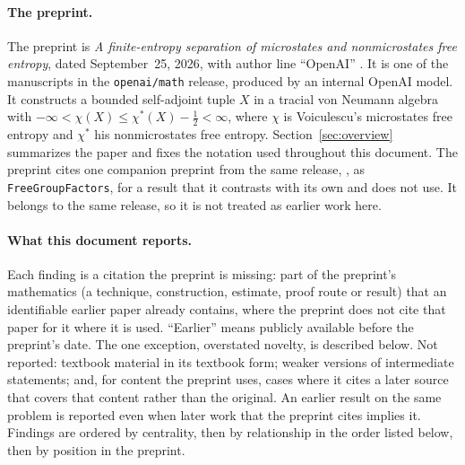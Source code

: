 \documentclass[11pt]{article}
\newcounter{finding}
\begin{document}
\paragraph{The preprint.}
The preprint is \emph{A finite-entropy separation of microstates and
nonmicrostates free entropy}, dated September~25, 2026, with author line
``OpenAI'' \cite{OAI-FiniteEntropySeparation}. It is one of the manuscripts in
the \texttt{openai/math} release, produced by an internal OpenAI model. It
constructs a bounded self-adjoint tuple $X$ in a tracial von Neumann algebra
with $-\infty<\chi(X)\le\chi^*(X)-\tfrac12<\infty$, where $\chi$ is
Voiculescu's microstates free entropy and $\chi^*$ his nonmicrostates free
entropy. Section~\ref{sec:overview} summarizes the paper and fixes the notation
used throughout this document. The preprint cites one companion preprint from
the same release, \cite{OAI-FreeGroupFactors}, as
\texttt{FreeGroupFactors}, for a result that it contrasts with its own and does
not use. It belongs to the same release, so it is not treated as earlier work
here.

\paragraph{What this document reports.}
Each finding is a citation the preprint is missing: part of the preprint's
mathematics (a technique, construction, estimate, proof route or result) that
an identifiable earlier paper already contains, where the preprint does not
cite that paper for it where it is used. ``Earlier'' means publicly available
before the preprint's date. The one exception, overstated novelty, is
described below. Not reported: textbook material in its textbook form; weaker versions of
intermediate statements; and, for content the preprint uses, cases where it
cites a later source that covers that content rather than the original. An
earlier result on the same problem is reported even when later work that the
preprint cites implies it. Findings are ordered by centrality, then by relationship in
the order listed below, then by position in the preprint.
\end{document}
